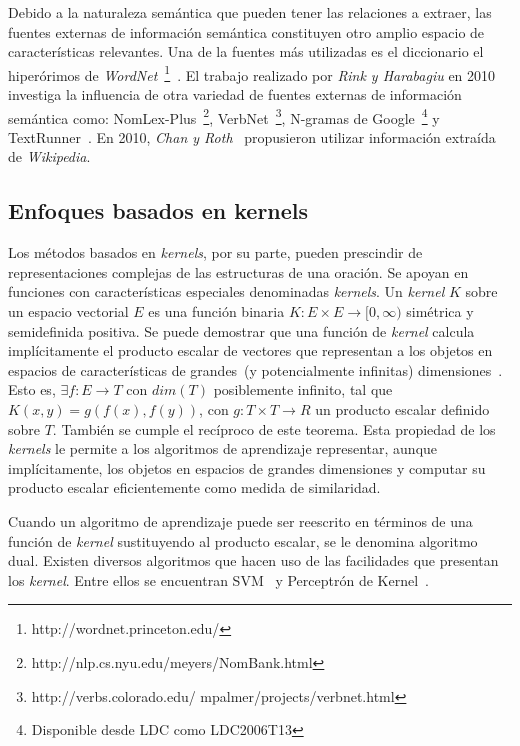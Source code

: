 Debido a la naturaleza semántica que pueden tener las relaciones a extraer, las fuentes externas de información semántica constituyen otro amplio espacio de características relevantes.
Una de la fuentes más utilizadas es el diccionario el hiperórimos de \textit{WordNet}~\footnote{http://wordnet.princeton.edu/}~\cite{guodong2005exploring, rink2010utd}.
El trabajo realizado por \textit{Rink y Harabagiu} en 2010~\cite{rink2010utd} investiga la influencia de otra variedad de fuentes externas de información semántica como: NomLex-Plus~\footnote{http://nlp.cs.nyu.edu/meyers/NomBank.html}, VerbNet~\footnote{http://verbs.colorado.edu/ mpalmer/projects/verbnet.html}, N-gramas de Google~\footnote{Disponible desde LDC como LDC2006T13} y TextRunner~\cite{yates2007textrunner}.
En 2010, \textit{Chan y Roth}~\cite{chan2010exploiting} propusieron utilizar información extraída de \textit{Wikipedia}.

\subsection{Enfoques basados en kernels}

Los métodos basados en \textit{kernels}, por su parte, pueden prescindir de representaciones complejas de las estructuras de una oración. 
Se apoyan en funciones con características especiales denominadas \textit{kernels}.
Un \textit{kernel} $K$ sobre un espacio vectorial $E$ es una función binaria $K:E\times E\rightarrow [0,\infty)$ simétrica y semidefinida positiva.
Se puede demostrar que una función de \textit{kernel} calcula implícitamente el producto escalar de vectores que representan a los objetos en espacios de características de grandes~(y potencialmente infinitas) dimensiones~\cite{demostracion}.
Esto es, $\exists f:E\rightarrow T$ con $dim(T)$ posiblemente infinito, tal que $K(x,y)=g(f(x),f(y))$, con $g:T\times T \rightarrow R$ un producto escalar definido sobre $T$. También se cumple el recíproco de este teorema.
Esta propiedad de los \textit{kernels} le permite a los algoritmos de aprendizaje representar, aunque implícitamente, los objetos en espacios de grandes dimensiones y computar su producto escalar eficientemente como medida de similaridad.

Cuando un algoritmo de aprendizaje puede ser reescrito en términos de una función de \textit{kernel} sustituyendo al producto escalar, se le denomina algoritmo dual.
Existen diversos algoritmos que hacen uso de las facilidades que presentan los \textit{kernel}.
Entre ellos se encuentran SVM~\cite{cortes1995support} y Perceptrón de Kernel~\cite{aizerman1964theoretical}.


